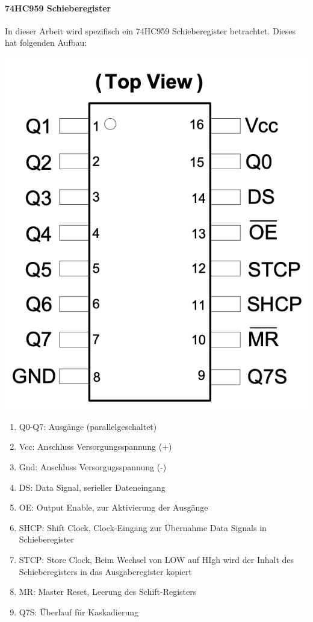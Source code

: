 \paragraph{74HC959 Schieberegister}
In dieser Arbeit wird spezifisch ein 74HC959 Schieberegister betrachtet.
Dieses hat folgenden Aufbau:

\begin{minipage}{0.4\textwidth}
	\includegraphics [width=1\textwidth] {img/Schieberegister}
\end{minipage}
\begin{minipage}{0.6\textwidth}
	\begin{enumerate}
		\item Q0-Q7: Ausgänge (parallelgeschaltet)
		\item Vcc: Anschluss Versorgungsspannung (+)
		\item Gnd: Anschluss Versorgugsspannung (-)
		\item DS: Data Signal, serieller Dateneingang
		\item OE: Output Enable, zur Aktivierung der Ausgänge
		\item SHCP: Shift Clock, Clock-Eingang zur Übernahme Data Signals in Schieberegister
		\item STCP: Store Clock, Beim Wechsel von LOW auf HIgh wird der Inhalt des Schieberegisters in das Ausgaberegister kopiert %
		\item MR: Master Reset, Leerung des Schift-Registers
		\item Q7S: Überlauf für Kaskadierung
	\end{enumerate}
\end{minipage}

